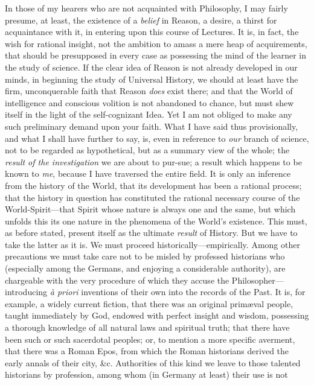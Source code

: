 In those of my hearers who are not acquainted with Philosophy, I may
fairly presume, at least, the existence of a \textit{belief} in
Reason, a desire, a thirst for acquaintance with it, in entering upon
this course of Lectures. It is, in fact, the wish for rational
insight, not the ambition to amass a mere heap of acquirements, that
should be presupposed in every case as possessing the mind of the
learner in the study of science. If the clear idea of Reason is not
already developed in our minds, in beginning the study of Universal
History, we should at least have the firm, unconquerable faith that
Reason \textit{does} exist there; and that the World of intelligence
and conscious volition is not abandoned to chance, but must shew
itself in the light of the self-cognizant Idea. Yet I am not obliged
to make any such preliminary demand upon your faith. What I have said
thus provisionally, and what I shall have further to say, is, even in
reference to \textit{our} branch of science, not to be regarded as
hypothetical, but as a summary view of the whole; the \textit{result
of the investigation} we are about to pur-sue; a result which
happens to be known to \textit{me}, because I have traversed the
entire field. It is only an inference from the history of the World,
that its development has been a rational process; that the history in
question has constituted the rational necessary course of the
World-Spirit---that Spirit whose nature is always one and the same,
but which unfolds this its one nature in the phenomena of the World's
existence. This must, as before stated, present itself as the ultimate
\textit{result} of History. But we have to take the latter as it is.
We must proceed historically---empirically. Among other precautions we
must take care not to be misled by professed historians who
(especially among the Germans, and enjoying a considerable authority),
are chargeable with the very procedure of which they accuse the
Philosopher---introducing \textit{\`a priori} inventions of their own
into the records of the Past. It is, for example, a widely current
fiction, that there was an original prim\ae val people, taught
immediately by God, endowed with perfect insight and wisdom,
possessing a thorough knowledge of all natural laws and spiritual
truth; that there have been such or such sacerdotal peoples; or, to
mention a more specific averment, that there was a Roman Epos, from
which the Roman historians derived the early annals of their city,
\&c. Authorities of this kind we leave to those talented historians by
profession, among whom (in Germany at least) their use is not
